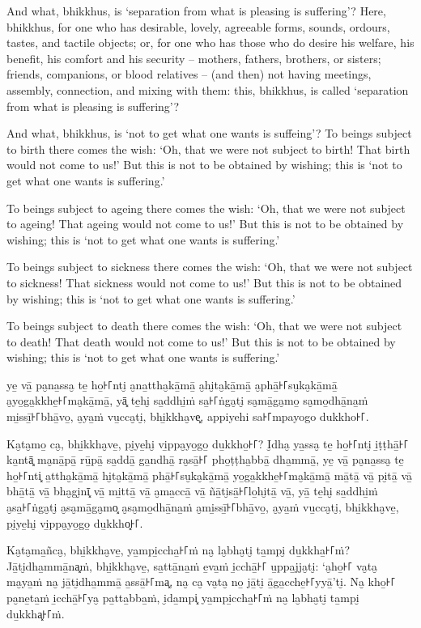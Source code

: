 And what, bhikkhus, is `separation from what is pleasing is suffering'? Here,
bhikkhus, for one who has desirable, lovely, agreeable forms, sounds, ordours,
tastes, and tactile objects; or, for one who has those who do desire his
welfare, his benefit, his comfort and his security -- mothers, fathers,
brothers, or sisters; friends, companions, or blood relatives -- (and then) not
having meetings, assembly, connection, and mixing with them: this, bhikkhus, is
called `separation from what is pleasing is suffering'?

And what, bhikkhus, is `not to get what one wants is suffeing'? To beings
subject to birth there comes the wish: `Oh, that we were not subject to birth!
That birth would not come to us!' But this is not to be obtained by wishing;
this is `not to get what one wants is suffering.'

To beings subject to ageing there comes the wish: `Oh, that we were not subject
to ageing! That ageing would not come to us!' But this is not to be obtained by
wishing; this is `not to get what one wants is suffering.'

To beings subject to sickness there comes the wish: `Oh, that we were not
subject to sickness! That sickness would not come to us!' But this is not to be
obtained by wishing; this is `not to get what one wants is suffering.'

To beings subject to death there comes the wish: `Oh, that we were not subject
to death! That death would not come to us!' But this is not to be obtained by
wishing; this is `not to get what one wants is suffering.'

\paliPage

ye̱ vā̱ pa̮na̱ssa̮ te̱ ho̱꜔꜒nti̮ a̮na̱ttha̮kā̱mā̱ a̮hi̮ta̮kā̱mā̱ a̮phā̱꜔꜒su̮ka̮kā̱mā̱ a̮yo̱ga̱kkhe̱꜔꜒ma̮kā̱mā̱, yā͓
te̱hi̮ sa̱ddhi̱ṁ sa̱꜔꜒ṅga̮ti̮ sa̮mā̱ga̮mo̱ sa̮mo̱dhā̱na̱ṁ mi̱ssī̱꜔꜒bhā̱vo̱, a̮ya̱ṁ vu̱cca̮ti̮, bhi̱kkha̮ve͓,
appiyehi sa꜔꜒mpayogo dukkho꜔꜒.

Ka̮ta̮mo̱ ca̮, bhi̱kkha̮ve̱, pi̮ye̱hi̮ vi̱ppa̮yo̱go̱ du̱kkho̱꜔꜒? I̮dha̮ ya̱ssa̮ te̱ ho̱꜔꜒nti̮ i̱ṭṭhā̱꜔꜒ ka̱ntā͓
ma̮nā̱pā̱ rū̱pā̱ sa̱ddā̱ ga̱ndhā̱ ra̮sā̱꜔꜒ pho̱ṭṭha̱bbā̱ dha̱mmā̱, ye̱ vā̱ pa̮na̱ssa̮ te̱ ho̱꜔꜒nti͓
a̱ttha̮kā̱mā̱ hi̮ta̮kā̱mā̱ phā̱꜔꜒su̮ka̮kā̱mā̱ yo̱ga̱kkhe̱꜔꜒ma̮kā̱mā̱ mā̱tā̱ vā̱ pi̮tā̱ vā̱ bhā̱tā̱ vā̱ bha̮gi̮nī͓
vā̱ mi̱ttā̱ vā̱ a̮ma̱ccā̱ vā̱ ñā̱ti̮sā̱꜔꜒lo̱hi̮tā̱ vā̱, yā̱ te̱hi̮ sa̱ddhi̱ṁ a̮sa̱꜔꜒ṅga̮ti̮ a̮sa̮mā̱ga̮mo͓
a̮sa̮mo̱dhā̱na̱ṁ a̮mi̱ssī̱꜔꜒bhā̱vo̱, a̮ya̱ṁ vu̱cca̮ti̮, bhi̱kkha̮ve̱, pi̮ye̱hi̮ vi̱ppa̮yo̱go̱ du̱kkho͓꜔꜒.

Ka̮ta̮ma̱ñca̮, bhi̱kkha̮ve̱, ya̱mpi̱ccha̱꜔꜒ṁ na̮ la̮bha̮ti̮ ta̱mpi̮ du̱kkha̱꜔꜒ṁ? Jā̱ti̮dha̱mmā̱na͓ṁ,
bhi̱kkha̮ve̱, sa̱ttā̱na̱ṁ e̱va̱ṁ i̱cchā̱꜔꜒ u̱ppa̱jja̮ti̮: ‘a̮ho̱꜔꜒ va̮ta̮ ma̮ya̱ṁ na̮ jā̱ti̮dha̱mmā̱ a̱ssā̱꜔꜒ma͓,
na̮ ca̮ va̮ta̮ no̱ jā̱ti̮ ā̱ga̱cche̱꜔꜒yyā̱’ti̮. Na̮ kho̱꜔꜒ pa̮ne̱ta̱ṁ i̱cchā̱꜔꜒ya̮ pa̱tta̱bba̱ṁ, i̮da̱mpi͓
ya̱mpi̱ccha̱꜔꜒ṁ na̮ la̮bha̮ti̮ ta̱mpi̮ du̱kkha͓꜔꜒ṁ.

